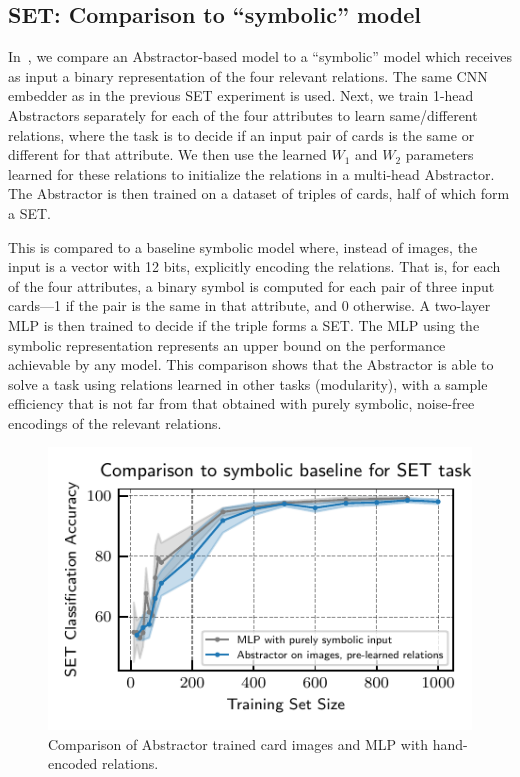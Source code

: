 \subsection{SET: Comparison to ``symbolic'' model}
In~, we compare an Abstractor-based model to a ``symbolic'' model which receives as input a binary representation of the four relevant relations. The same CNN embedder as in the previous SET experiment is used. Next, we train 1-head Abstractors separately for each of the four attributes to learn same/different relations, where the task is to decide if an input pair of cards is the same or different for that attribute. We then use the learned $W_1$ and $W_2$ parameters learned for these relations to initialize the relations in a multi-head Abstractor. The Abstractor is then trained on a dataset of triples of cards, half of which form a SET.

This is compared to a baseline symbolic model where, instead of images, the input is a vector with 12 bits,
explicitly encoding the relations. That is, for each of the four attributes, a binary symbol is computed for each pair of three input cards---1 if the pair is the same in that attribute, and 0 otherwise. A two-layer MLP is then trained to decide if the triple forms a SET. The MLP using the symbolic representation represents an upper bound on the performance achievable by any model. This comparison shows that the Abstractor is able to solve a task using relations learned in other tasks (modularity), with a sample efficiency that is not far from that obtained with purely symbolic, noise-free encodings of the relevant relations.

\begin{figure}[ht]
    \centering

    \includegraphics{figures/experiments/set_symbolic_vs_abstractor.pdf}
    \caption{Comparison of Abstractor trained card images and MLP with hand-encoded relations.}%
    \label{fig:exp_set_symbolic}
\end{figure}